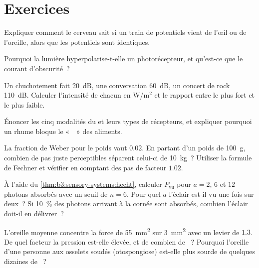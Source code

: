 \section{Exercices}

\begin{exercise}[$\star$]\label{exo:b3:sensory-systems:1}
Expliquer comment le cerveau sait si un train de potentiels vient de
l'œil ou de l'oreille, alors que les potentiels sont identiques.
\end{exercise}

\begin{exercise}[$\star$]\label{exo:b3:sensory-systems:2}
Pourquoi la lumière hyperpolarise-t-elle un photorécepteur, et qu'est-ce
que le courant d'obscurité~?
\end{exercise}

\begin{exercise}[$\star$]\label{exo:b3:sensory-systems:3}
Un chuchotement fait \qty{20}{dB}, une conversation \qty{60}{dB}, un
concert de rock \qty{110}{dB}. Calculer l'intensité de chacun en
W/m$^{2}$ et le rapport entre le plus fort et le plus faible.
\end{exercise}

\begin{exercise}[$\star$]\label{exo:b3:sensory-systems:4}
Énoncer les cinq modalités du  et leurs types de récepteurs, et
expliquer pourquoi un rhume bloque le «~~» des aliments.
\end{exercise}

\begin{exercise}[$\star\star$]\label{exo:b3:sensory-systems:5}
La fraction de Weber pour le poids vaut $0.02$. En partant d'un poids de
\qty{100}{g}, combien de pas juste perceptibles séparent celui-ci de
\qty{10}{kg}~? Utiliser la formule de Fechner et vérifier en comptant
des pas de facteur $1.02$.
\end{exercise}

\begin{exercise}[$\star\star$]\label{exo:b3:sensory-systems:6}
À l'aide du \cref{thm:b3:sensory-systems:hecht}, calculer
$P_{\text{vu}}$ pour $a = 2$, $6$ et $12$ photons absorbés avec un seuil
de $n = 6$. Pour quel $a$ l'éclair est-il vu une fois sur deux~? Si
\qty{10}{\%} des photons arrivant à la cornée sont absorbés, combien
l'éclair doit-il en délivrer~?
\end{exercise}

\begin{exercise}[$\star\star$]\label{exo:b3:sensory-systems:7}
L'oreille moyenne concentre la force de \qty{55}{mm^2} sur
\qty{3}{mm^2} avec un levier de $1.3$. De quel facteur la pression
est-elle élevée, et de combien de ~? Pourquoi l'oreille d'une
personne aux osselets soudés (otospongiose) est-elle plus sourde de
quelques dizaines de ~?
\end{exercise}

